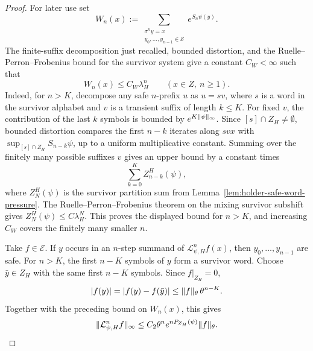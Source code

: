 \begin{proof}
For later use set
\[
  W_n(x):=
  \sum_{\substack{\sigma^n y=x\\ y_0,\ldots,y_{n-1}\in\mathcal S}}
  e^{S_n\psi(y)} .
\]
The finite-suffix decomposition just recalled, bounded distortion, and
the Ruelle--Perron--Frobenius bound for the survivor system give a
constant \(C_W<\infty\) such that
\[
  W_n(x)\leq C_W\lambda_H^n
  \qquad (x\in Z,\ n\geq1).
\]
Indeed, for \(n>K\), decompose any safe \(n\)-prefix \(u\) as \(u=sv\),
where \(s\) is a word in the survivor alphabet and \(v\) is a transient
suffix of length \(k\leq K\).  For fixed \(v\), the contribution of the
last \(k\) symbols is bounded by \(e^{K\lVert \psi\rVert_\infty}\).  Since
\([s]\cap Z_H\neq\emptyset\), bounded distortion compares the first
\(n-k\) iterates along \(svx\) with
\(\sup_{[s]\cap Z_H}S_{n-k}\psi\), up to a uniform multiplicative
constant.  Summing over the finitely many possible suffixes \(v\) gives
an upper bound by a constant times
\[
  \sum_{k=0}^{K} Z_{n-k}^H(\psi),
\]
where \(Z_N^H(\psi)\) is the survivor partition sum from
Lemma~\ref{lem:holder-safe-word-pressure}.  The
Ruelle--Perron--Frobenius theorem on the mixing survivor subshift gives
\(Z_N^H(\psi)\leq C\lambda_H^N\).  This proves the displayed bound for
\(n>K\), and increasing \(C_W\) covers the finitely many smaller \(n\).

Take \(f\in\mathcal E\).  If \(y\) occurs in an \(n\)-step summand of
\(\mathcal L_{\psi,H}^n f(x)\), then \(y_0,\ldots,y_{n-1}\) are safe.
For \(n>K\), the first \(n-K\) symbols of \(y\) form a survivor word.
Choose \(\bar y\in Z_H\) with the same first \(n-K\) symbols.  Since
\(f|_{Z_H}=0\),
\[
  \lvert f(y)\rvert
  =
  \lvert f(y)-f(\bar y)\rvert
  \leq
  \lVert f\rVert_\theta\,\theta^{n-K}.
\]
Together with the preceding bound on \(W_n(x)\), this gives
\[
  \lVert \mathcal L_{\psi,H}^n f\rVert_\infty
  \leq
  C_2\theta^n e^{nP_{Z_H}(\psi)}\lVert f\rVert_\theta .
\]


\end{proof}
